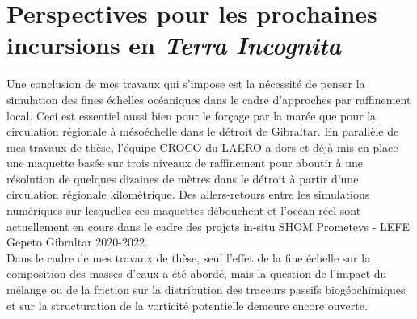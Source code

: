 \color{blue}
\section{Perspectives pour les prochaines incursions en \textit{Terra Incognita}}
Une conclusion de mes travaux qui s'impose est la nécessité de penser la simulation des fines échelles océaniques dans le cadre d'approches par raffinement local. Ceci est essentiel aussi bien pour le forçage par la marée que pour la circulation régionale à mésoéchelle dans le détroit de Gibraltar. En parallèle de mes travaux de thèse, l'équipe CROCO du LAERO a dors et déjà mis en place une maquette basée sur trois niveaux de raffinement pour aboutir à une résolution de quelques dizaines de mètres dans le détroit à partir d'une circulation régionale kilométrique. Des allers-retours entre les simulations numériques sur lesquelles ces maquettes débouchent et l'océan réel sont actuellement en cours dans le cadre des projets in-situ SHOM Prometevs - LEFE Gepeto Gibraltar 2020-2022.\\
\color{blue}
Dans le cadre de mes travaux de thèse, seul l'effet de la fine échelle sur la composition des masses d'eaux a été abordé, mais la question de l'impact du mélange ou de la friction sur la distribution des traceurs passifs biogéochimiques \citep{penney_2020} et sur la structuration de la vorticité potentielle \cite{morel_potential_2019} demeure encore ouverte.\\
